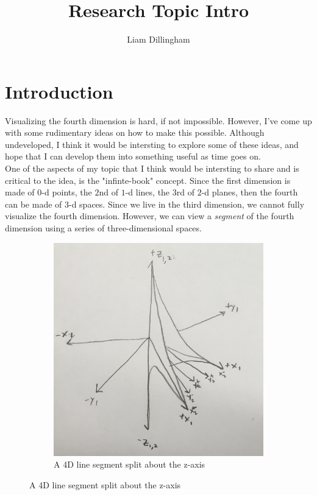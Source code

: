 \documentclass[20pt]{article} %
\title{Research Topic Intro}
\author{Liam Dillingham}
\begin{document}
\maketitle

\section{Introduction}
Visualizing the fourth dimension is hard, if not impossible.  However, I've come up with some rudimentary ideas on how to make this possible.  Although undeveloped, I think it would be intersting to explore some of these ideas, and hope that I can develop them into something useful as time goes on. \\ 

One of the aspects of my topic that I think would be intersting to share and is critical to the idea, is the "infinte-book" concept.  Since the first dimension is made of $0$-d points, the $2$nd of $1$-d lines, the $3$rd of $2$-d planes, then the fourth can be made of $3$-d spaces.  Since we live in the third dimension, we cannot fully visualize the fourth dimension. However, we can view a \textit{segment} of the fourth dimension using a series of three-dimensional spaces.

\begin{figure}[!htbp]
  	\centering
   	\begin{subfigure}[p]{0.5\linewidth}
    	\includegraphics[width=\linewidth]{./figures/fig1.jpg}
	\caption{A 4D line segment split about the z-axis}
	\label{fig:sub1}
   	\end{subfigure}
\end{figure} 
\end{document}
